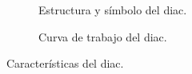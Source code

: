        \begin{figure}[H]
            \centering
            \begin{subfigure}[ht]{0.48\textwidth}
              \caption{Estructura y símbolo del diac.}
              \label{fig:EstrucDiac}
            \end{subfigure}
            \hfill 
            \begin{subfigure}[ht]{0.48\textwidth}
              \caption{Curva de trabajo del diac.}
              \label{fig:CurvaDiac}
            \end{subfigure}
            \caption{Características del diac.}
        \end{figure}

